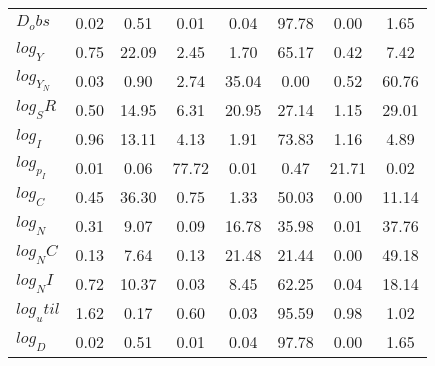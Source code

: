 \begin{center}
\begin{longtable}{lccccccc}
$D_obs     $	 & 	        0.02	 & 	        0.51	 & 	        0.01	 & 	        0.04	 & 	       97.78	 & 	        0.00	 & 	        1.65 \\ 
$log_Y     $	 & 	        0.75	 & 	       22.09	 & 	        2.45	 & 	        1.70	 & 	       65.17	 & 	        0.42	 & 	        7.42 \\ 
$log_Y_N   $	 & 	        0.03	 & 	        0.90	 & 	        2.74	 & 	       35.04	 & 	        0.00	 & 	        0.52	 & 	       60.76 \\ 
$log_SR    $	 & 	        0.50	 & 	       14.95	 & 	        6.31	 & 	       20.95	 & 	       27.14	 & 	        1.15	 & 	       29.01 \\ 
$log_I     $	 & 	        0.96	 & 	       13.11	 & 	        4.13	 & 	        1.91	 & 	       73.83	 & 	        1.16	 & 	        4.89 \\ 
$log_p_I   $	 & 	        0.01	 & 	        0.06	 & 	       77.72	 & 	        0.01	 & 	        0.47	 & 	       21.71	 & 	        0.02 \\ 
$log_C     $	 & 	        0.45	 & 	       36.30	 & 	        0.75	 & 	        1.33	 & 	       50.03	 & 	        0.00	 & 	       11.14 \\ 
$log_N     $	 & 	        0.31	 & 	        9.07	 & 	        0.09	 & 	       16.78	 & 	       35.98	 & 	        0.01	 & 	       37.76 \\ 
$log_NC    $	 & 	        0.13	 & 	        7.64	 & 	        0.13	 & 	       21.48	 & 	       21.44	 & 	        0.00	 & 	       49.18 \\ 
$log_NI    $	 & 	        0.72	 & 	       10.37	 & 	        0.03	 & 	        8.45	 & 	       62.25	 & 	        0.04	 & 	       18.14 \\ 
$log_util  $	 & 	        1.62	 & 	        0.17	 & 	        0.60	 & 	        0.03	 & 	       95.59	 & 	        0.98	 & 	        1.02 \\ 
$log_D     $	 & 	        0.02	 & 	        0.51	 & 	        0.01	 & 	        0.04	 & 	       97.78	 & 	        0.00	 & 	        1.65 \\ 
\end{longtable}
 \end{center}
